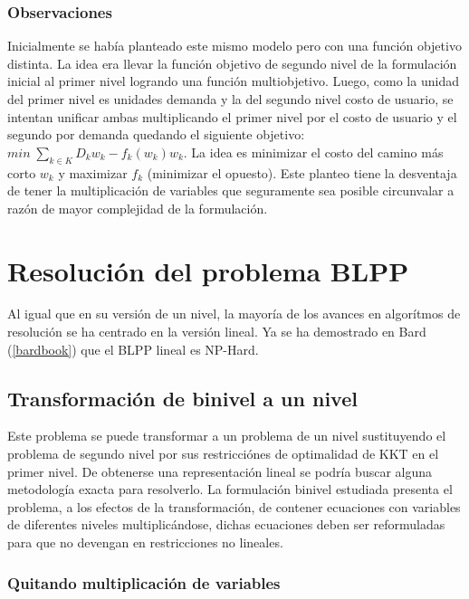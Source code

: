 \documentclass{article}
\begin{document}
  \subsubsection*{Observaciones}

  Inicialmente se había planteado este mismo modelo pero con una función objetivo distinta. La idea era llevar la función objetivo de segundo nivel de la formulación inicial al primer nivel logrando una función multiobjetivo. Luego, como la unidad del primer nivel es unidades demanda y la del segundo nivel costo de usuario, se intentan unificar ambas multiplicando el primer nivel por el costo de usuario y el segundo por demanda quedando el siguiente objetivo: $min\;\sum_{k \in K} D_kw_k - f_k(w_k)w_k$. La idea es minimizar el costo del camino más corto $w_k$ y maximizar $f_k$ (minimizar el opuesto). Este planteo tiene la desventaja de tener la multiplicación de variables que seguramente sea posible circunvalar a razón de mayor complejidad de la formulación.

  \section*{Resolución del problema BLPP}

  Al igual que en su versión de un nivel, la mayoría de los avances en algorítmos de resolución se ha centrado en la versión lineal. Ya se ha demostrado en Bard (\ref{bardbook}) que el BLPP lineal es NP-Hard.

  \subsection*{Transformación de binivel a un nivel}

  Este problema se puede transformar a un problema de un nivel sustituyendo el problema de segundo nivel por sus restricciónes de optimalidad de KKT en el primer nivel. De obtenerse una representación lineal se podría buscar alguna metodología exacta para resolverlo. La formulación binivel estudiada presenta el problema, a los efectos de la transformación, de contener ecuaciones con variables de diferentes niveles multiplicándose, dichas ecuaciones deben ser reformuladas para que no devengan en restricciones no lineales.

  \subsubsection*{Quitando multiplicación de variables}
\end{document}
